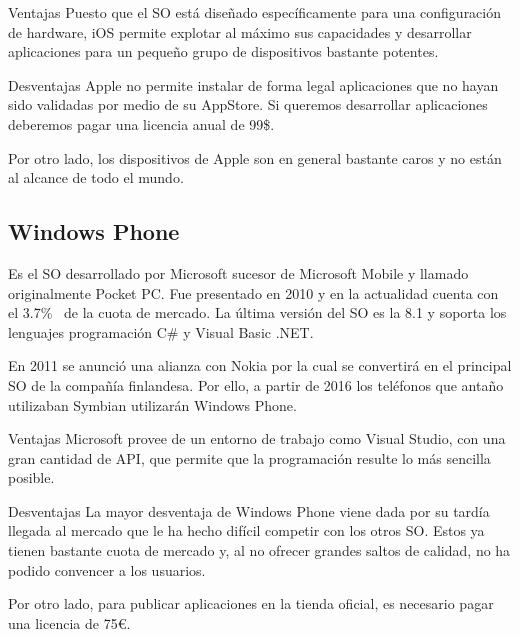 \begin{definitionlist}
  \item[Ventajas] Puesto que el \acs{SO} está diseñado específicamente para una configuración de
    hardware, iOS permite explotar al máximo sus capacidades y desarrollar aplicaciones para un
    pequeño grupo de dispositivos bastante potentes.

  \item[Desventajas] Apple no permite instalar de forma legal aplicaciones que no hayan sido
    validadas por medio de su AppStore. Si queremos desarrollar aplicaciones deberemos pagar una
    licencia anual de 99\$.

    Por otro lado, los dispositivos de Apple son en general bastante caros y no están al alcance de
    todo el mundo.

\end{definitionlist}

\subsection{Windows Phone}

Es el \acs{SO} desarrollado por Microsoft sucesor de Microsoft Mobile y llamado originalmente Pocket
PC. Fue presentado en 2010 y en la actualidad cuenta con el 3.7\%~\cite{Llamas13} de la cuota de
mercado. La última versión del \acs{SO} es la 8.1 y soporta los lenguajes programación C\# y Visual
Basic .NET.

En 2011 se anunció una alianza con Nokia por la cual se convertirá en el principal \acs{SO} de la
compañía finlandesa. Por ello, a partir de 2016 los teléfonos que antaño utilizaban Symbian
utilizarán Windows Phone.

\begin{definitionlist}
  \item[Ventajas] Microsoft provee de un entorno de trabajo como Visual Studio, con una gran
    cantidad de \acf{API}, que permite que la programación resulte lo más sencilla posible.

  \item[Desventajas] La mayor desventaja de Windows Phone viene dada por su tardía llegada al
    mercado que le ha hecho difícil competir con los otros \acs{SO}. Estos ya tienen bastante cuota
    de mercado y, al no ofrecer grandes saltos de calidad, no ha podido convencer a los usuarios.

    Por otro lado, para publicar aplicaciones en la tienda oficial, es necesario pagar una licencia
    de 75\euro{}.

\end{definitionlist}

